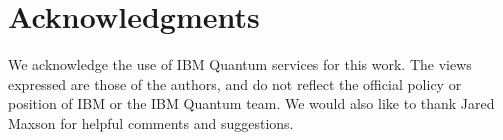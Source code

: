 \documentclass[aps,prl, reprint]{revtex4-2}
\begin{document}
\section{Acknowledgments}

We acknowledge the use of IBM Quantum services for this work. The views expressed are those of the authors, and do not reflect the official policy or position of IBM or the IBM Quantum team. We would also like to thank Jared Maxson for helpful comments and suggestions.


\end{document}
